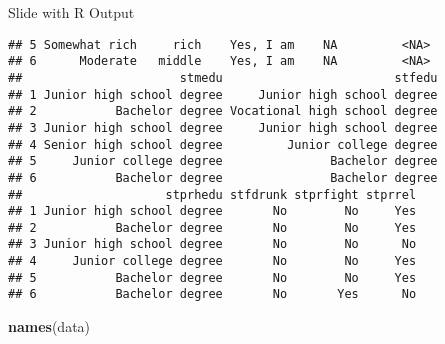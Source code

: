 \documentclass[
  ignorenonframetext,
]{beamer}
\newenvironment{Shaded}{\begin{snugshade}}{\end{snugshade}}
\newcommand{\FunctionTok}[1]{\textcolor[rgb]{0.13,0.29,0.53}{\textbf{#1}}}
\newcommand{\NormalTok}[1]{#1}
\begin{document}
\begin{frame}[fragile]{Slide with R Output}
\begin{verbatim}
## 5 Somewhat rich     rich    Yes, I am    NA         <NA>
## 6      Moderate   middle    Yes, I am    NA         <NA>
##                      stmedu                        stfedu
## 1 Junior high school degree     Junior high school degree
## 2           Bachelor degree Vocational high school degree
## 3 Junior high school degree     Junior high school degree
## 4 Senior high school degree         Junior college degree
## 5     Junior college degree               Bachelor degree
## 6           Bachelor degree               Bachelor degree
##                    stprhedu stfdrunk stprfight stprrel
## 1 Junior high school degree       No        No     Yes
## 2           Bachelor degree       No        No     Yes
## 3 Junior high school degree       No        No      No
## 4     Junior college degree       No        No     Yes
## 5           Bachelor degree       No        No     Yes
## 6           Bachelor degree       No       Yes      No
\end{verbatim}

\begin{Shaded}
\begin{Highlighting}[]
\FunctionTok{names}\NormalTok{(data)}
\end{Highlighting}
\end{Shaded}


\end{frame}
\end{document}

